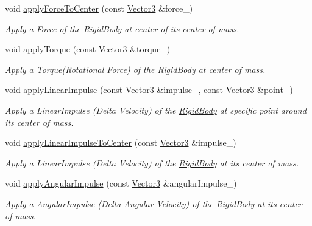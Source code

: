 \begin{DoxyCompactItemize}
void \hyperlink{class_magnum_1_1_physics3_1_1_vehicle_a78ddb176a78204b6aca72b70bacd7a9e}{apply\+Force\+To\+Center} (const \hyperlink{class_magnum_1_1_vector3}{Vector3} \&force\+\_\+)
\begin{DoxyCompactList}\small\item\em Apply a Force of the \hyperlink{class_magnum_1_1_physics3_1_1_rigid_body}{Rigid\+Body} at center of its center of mass. \end{DoxyCompactList}\item 
void \hyperlink{class_magnum_1_1_physics3_1_1_vehicle_aebcf231f4a9d674024bc00c12fc16394}{apply\+Torque} (const \hyperlink{class_magnum_1_1_vector3}{Vector3} \&torque\+\_\+)
\begin{DoxyCompactList}\small\item\em Apply a Torque(\+Rotational Force) of the \hyperlink{class_magnum_1_1_physics3_1_1_rigid_body}{Rigid\+Body} at center of mass. \end{DoxyCompactList}\item 
void \hyperlink{class_magnum_1_1_physics3_1_1_vehicle_ae920d28badd225f4e32cd78215d8fac6}{apply\+Linear\+Impulse} (const \hyperlink{class_magnum_1_1_vector3}{Vector3} \&impulse\+\_\+, const \hyperlink{class_magnum_1_1_vector3}{Vector3} \&point\+\_\+)
\begin{DoxyCompactList}\small\item\em Apply a Linear\+Impulse (Delta Velocity) of the \hyperlink{class_magnum_1_1_physics3_1_1_rigid_body}{Rigid\+Body} at specific point around its center of mass. \end{DoxyCompactList}\item 
void \hyperlink{class_magnum_1_1_physics3_1_1_vehicle_a0a31dc975e8221bc45a2289e9edfbb07}{apply\+Linear\+Impulse\+To\+Center} (const \hyperlink{class_magnum_1_1_vector3}{Vector3} \&impulse\+\_\+)
\begin{DoxyCompactList}\small\item\em Apply a Linear\+Impulse (Delta Velocity) of the \hyperlink{class_magnum_1_1_physics3_1_1_rigid_body}{Rigid\+Body} at its center of mass. \end{DoxyCompactList}\item 
void \hyperlink{class_magnum_1_1_physics3_1_1_vehicle_af0ba6863155dceba4ceed8e67d440c3c}{apply\+Angular\+Impulse} (const \hyperlink{class_magnum_1_1_vector3}{Vector3} \&angular\+Impulse\+\_\+)
\begin{DoxyCompactList}\small\item\em Apply a Angular\+Impulse (Delta Angular Velocity) of the \hyperlink{class_magnum_1_1_physics3_1_1_rigid_body}{Rigid\+Body} at its center of mass. \end{DoxyCompactList}\item 

\end{DoxyCompactItemize}
